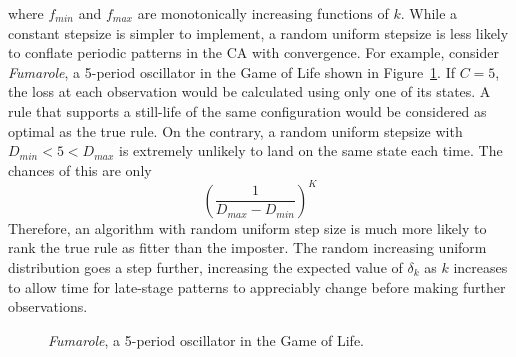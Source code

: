 where $f_{min}$ and $f_{max}$ are monotonically increasing functions of $k$. While a constant stepsize is simpler to implement, a random uniform stepsize is less likely to conflate periodic patterns in the CA with convergence. For example, consider \textit{Fumarole}, a 5-period oscillator in the Game of Life shown in Figure~\ref{fig:fumarole}. If $C=5$, the loss at each observation would be calculated using only one of its states. A rule that supports a still-life of the same configuration would be considered as optimal as the true rule. On the contrary, a random uniform stepsize with $D_{min} < 5 < D_{max}$ is extremely unlikely to land on the same state each time. The chances of this are only
\begin{equation}
\left(\frac{1}{D_{max} - D_{min}}\right)^K
\end{equation}
Therefore, an algorithm with random uniform step size is much more likely to rank the true rule as fitter than the imposter. The random increasing uniform distribution goes a step further, increasing the expected value of $\delta_k$ as $k$ increases to allow time for late-stage patterns to appreciably change before making further observations.\\

\begin{figure}[!h]
\centering
            \hfill
            \hfill
            \hfill
            \hfill
            \hfill
            \caption{\textit{Fumarole}, a 5-period oscillator in the Game of Life. \cite{fumarole}}
\label{fig:fumarole}
\end{figure}

